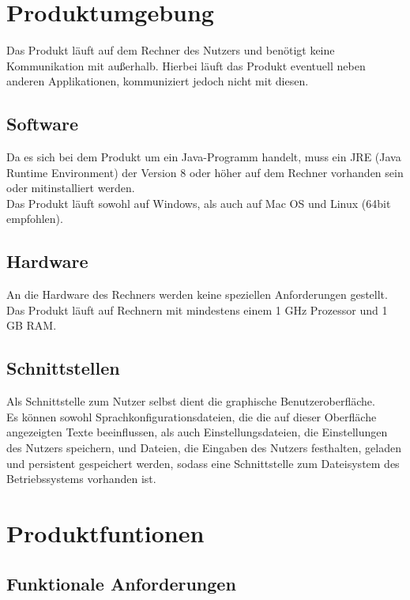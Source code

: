 \documentclass[parskip=full]{scrartcl}
\begin{document}
 

\section{Produktumgebung}
Das Produkt läuft auf dem Rechner des Nutzers und benötigt keine Kommunikation mit außerhalb. Hierbei läuft das Produkt eventuell neben anderen Applikationen, kommuniziert jedoch nicht mit diesen.

\subsection{Software}
Da es sich bei dem Produkt um ein Java-Programm handelt, muss ein JRE (Java Runtime Environment) der Version 8 oder höher auf dem Rechner vorhanden sein oder mitinstalliert werden. \\
Das Produkt läuft sowohl auf Windows, als auch auf Mac OS und Linux (64bit empfohlen).

\subsection{Hardware}
An die Hardware des Rechners werden keine speziellen Anforderungen gestellt. Das Produkt läuft auf Rechnern mit mindestens einem 1 GHz Prozessor und 1 GB RAM.

\subsection{Schnittstellen}
Als Schnittstelle zum Nutzer selbst dient die graphische Benutzeroberfläche. \\ Es können sowohl Sprachkonfigurationsdateien, die die auf dieser Oberfläche angezeigten Texte beeinflussen, als auch Einstellungsdateien, die Einstellungen des Nutzers speichern, und Dateien, die Eingaben des Nutzers festhalten, geladen und persistent gespeichert werden, sodass eine Schnittstelle zum Dateisystem des Betriebssystems vorhanden ist. 

\newpage

\section{Produktfuntionen}
	 	\subsection{Funktionale Anforderungen}
\end{document}

